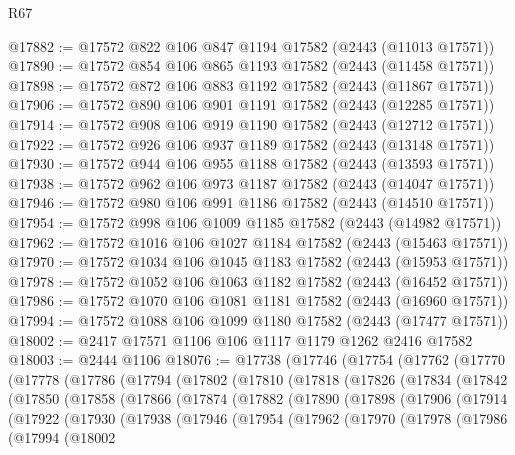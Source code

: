 \begin{lexlean}{R67}
\begin{coremodule}
@17882 := @17572 @822 @106 @847 @1194 @17582 (@2443 (@11013 @17571))
@17890 := @17572 @854 @106 @865 @1193 @17582 (@2443 (@11458 @17571))
@17898 := @17572 @872 @106 @883 @1192 @17582 (@2443 (@11867 @17571))
@17906 := @17572 @890 @106 @901 @1191 @17582 (@2443 (@12285 @17571))
@17914 := @17572 @908 @106 @919 @1190 @17582 (@2443 (@12712 @17571))
@17922 := @17572 @926 @106 @937 @1189 @17582 (@2443 (@13148 @17571))
@17930 := @17572 @944 @106 @955 @1188 @17582 (@2443 (@13593 @17571))
@17938 := @17572 @962 @106 @973 @1187 @17582 (@2443 (@14047 @17571))
@17946 := @17572 @980 @106 @991 @1186 @17582 (@2443 (@14510 @17571))
@17954 := @17572 @998 @106 @1009 @1185 @17582 (@2443 (@14982 @17571))
@17962 := @17572 @1016 @106 @1027 @1184 @17582 (@2443 (@15463 @17571))
@17970 := @17572 @1034 @106 @1045 @1183 @17582 (@2443 (@15953 @17571))
@17978 := @17572 @1052 @106 @1063 @1182 @17582 (@2443 (@16452 @17571))
@17986 := @17572 @1070 @106 @1081 @1181 @17582 (@2443 (@16960 @17571))
@17994 := @17572 @1088 @106 @1099 @1180 @17582 (@2443 (@17477 @17571))
@18002 := @2417 @17571 @1106 @106 @1117 @1179 @1262 @2416 @17582
@18003 := @2444 @1106
@18076 := @17738
    (@17746
      (@17754
        (@17762
          (@17770
            (@17778
              (@17786
                (@17794
                  (@17802
                    (@17810
                      (@17818
                        (@17826
                          (@17834
                            (@17842
                              (@17850
                                (@17858
                                  (@17866
                                    (@17874
                                      (@17882
                                        (@17890
                                          (@17898
                                            (@17906
                                              (@17914
                                                (@17922
                                                  (@17930
                                                    (@17938
                                                      (@17946
                                                        (@17954
                                                          (@17962
                                                            (@17970
                                                              (@17978
                                                                (@17986
                                                                  (@17994
                                                                    (@18002

\end{coremodule}
\end{lexlean}
